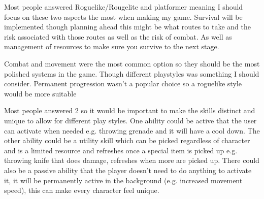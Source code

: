 \documentclass{article}
\newcommand{\parBr}{\vspace{5mm}}%
\begin{document}
\parBr

Most people answered Roguelike/Rougelite and platformer meaning I should focus on these two aspects the most when making my game. Survival will be implemented though planning ahead this might be what routes to take and the risk associated with those routes as well as the risk of combat. As well as management of resources to make sure you survive to the next stage. 

 \linebreak
{}

\parBr

Combat and movement were the most common option so they should be the most polished systems in the game. Though different playstyles was something I should consider. Permanent progression wasn't a popular choice so a roguelike style would be more suitable 

 \linebreak
{}

\parBr

Most people answered 2 so it would be important to make the skills distinct and unique to allow for different play styles. One ability could be active that the user can activate when needed e.g. throwing grenade and it will have a cool down. The other ability could be a utility skill which can be picked regardless of character and is a limited resource and refreshes once a special item is picked up e.g. throwing knife that does damage, refreshes when more are picked up. There could also be a passive ability that the player doesn't need to do anything to activate it, it will be permanently active in the background (e.g. increased movement speed), this can make every character feel unique. 

 \linebreak
{}
\end{document}
